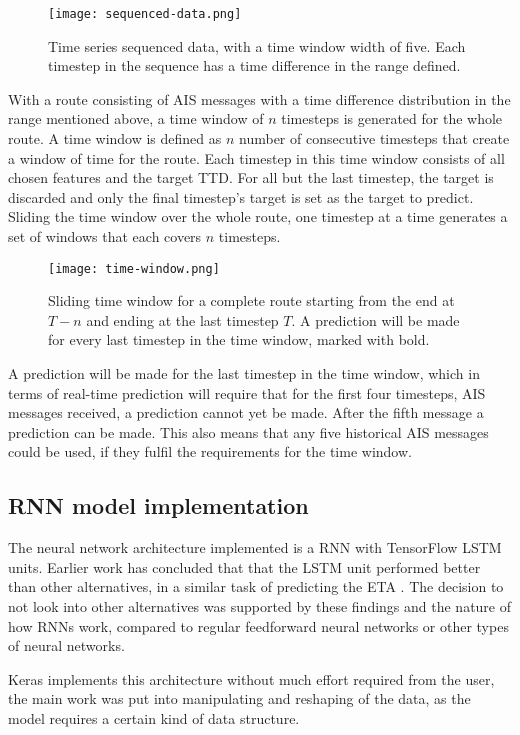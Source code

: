 \documentclass[../main.tex]{subfiles}
\begin{document}
\begin{figure}[H]
	\centering
	\texttt{[image: sequenced-data.png]}
	\caption{Time series sequenced data, with a time window width of five. Each timestep in the sequence has a time difference in the range defined.}
	\label{fig:seq-data}
\end{figure}

With a route consisting of AIS messages with a time difference distribution in the range mentioned above, a time window of $n$ timesteps is generated for the whole route. A time window is defined as $n$ number of consecutive timesteps that create a window of time for the route. Each timestep in this time window consists of all chosen features and the target TTD. For all but the last timestep, the target is discarded and only the final timestep's target is set as the target to predict. Sliding the time window over the whole route, one timestep at a time generates a set of windows that each covers $n$ timesteps. 

\begin{figure}[H]
	\centering
	\texttt{[image: time-window.png]}
	\caption{Sliding time window for a complete route starting from the end at $T-n$ and ending at the last timestep $T$. A prediction will be made for every last timestep in the time window, marked with bold.}
	\label{fig:time-window}
\end{figure}

A prediction will be made for the last timestep in the time window, which in terms of real-time prediction will require that for the first four timesteps, AIS messages received, a prediction cannot yet be made. After the fifth message a prediction can be made. This also means that any five historical AIS messages could be used, if they fulfil the requirements for the time window.


\subsection{RNN model implementation}
\label{sec:rnn-impl}
The neural network architecture implemented is a RNN with TensorFlow LSTM units. Earlier work has concluded that that the LSTM unit performed better than other alternatives, in a similar task of predicting the ETA \cite{El_2020}. The decision to not look into other alternatives was supported by these findings and the nature of how RNNs work, compared to regular feedforward neural networks or other types of neural networks.

Keras implements this architecture without much effort required from the user, the main work was put into manipulating and reshaping of the data, as the model requires a certain kind of data structure.
\end{document}
